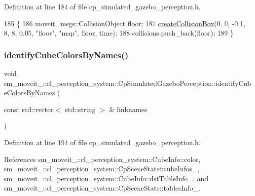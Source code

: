 Definition at line 184 of file cp\+\_\+simulated\+\_\+gazebo\+\_\+perception.\+h.


\begin{DoxyCode}
185             \{
186                 moveit\_msgs::CollisionObject floor;
187                 \hyperlink{classsm__moveit__4_1_1cl__perception__system_1_1CpSimulatedGazeboPerception_aae9d3b564d1442453dac71a2d9fe89fe}{createCollisionBox}(0, 0, -0.1, 8, 8, 0.05, \textcolor{stringliteral}{"floor"}, \textcolor{stringliteral}{"map"}, floor, time);
188                 collisions.push\_back(floor);
189             \}
\end{DoxyCode}
\mbox{\label{classsm__moveit__4_1_1cl__perception__system_1_1CpSimulatedGazeboPerception_aac02fd742b0074f62d8909ce00a02d3b}} 
\subsubsection{\texorpdfstring{identify\+Cube\+Colors\+By\+Names()}{identifyCubeColorsByNames()}}
{\footnotesize\ttfamily void sm\+\_\+moveit\+\_\+::cl\+\_\+perception\+\_\+system\+::\+Cp\+Simulated\+Gazebo\+Perception\+::identify\+Cube\+Colors\+By\+Names (\begin{DoxyParamCaption}\item[{const std\+::vector$<$ std\+::string $>$ \&}]{linknames }\end{DoxyParamCaption})\hspace{0.3cm}{\ttfamily [inline]}}



Definition at line 194 of file cp\+\_\+simulated\+\_\+gazebo\+\_\+perception.\+h.



References sm\+\_\+moveit\+\_\+::cl\+\_\+perception\+\_\+system\+::\+Cube\+Info\+::color, sm\+\_\+moveit\+\_\+::cl\+\_\+perception\+\_\+system\+::\+Cp\+Scene\+State\+::cube\+Infos\+\_\+, sm\+\_\+moveit\+\_\+::cl\+\_\+perception\+\_\+system\+::\+Cube\+Info\+::dst\+Table\+Info\+\_\+, and sm\+\_\+moveit\+\_\+::cl\+\_\+perception\+\_\+system\+::\+Cp\+Scene\+State\+::tables\+Info\+\_\+.


